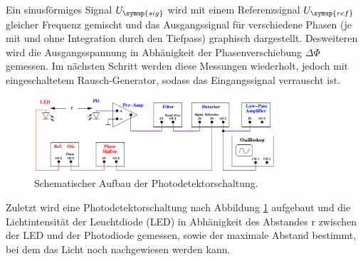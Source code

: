 Ein sinusförmiges Signal $U_\symup{sig}$ wird mit einem Referenzsignal
$U_\symup{ref}$ gleicher Frequenz gemischt und das Ausgangssignal für verschiedene
Phasen (je mit und ohne Integration durch den Tiefpass) graphisch dargestellt.
Desweiteren wird die Ausgangsspannung in Abhänigkeit der Phasenverschiebung
$\Delta\Phi$ gemessen.
Im nächsten Schritt werden diese Messungen wiederholt, jedoch mit eingeschaltetem
Rausch-Generator, sodass das Eingangssignal verrauscht ist.
\begin{figure}
  \centering
  \includegraphics[width=0.8\textwidth]{photodetektor.png}
  \caption{Schematischer Aufbau der Photodetektorschaltung\cite{sample}.}
  \label{fig:photodetektor}
\end{figure}
Zuletzt wird eine Photodetektorschaltung nach Abbildung \ref{fig:photodetektor}
aufgebaut und die Lichtintensität der Leuchtdiode (LED) in Abhänigkeit des Abstandes
r zwischen der LED und der Photodiode gemessen, sowie der maximale Abstand bestimmt,
bei dem das Licht noch nachgewiesen werden kann.
